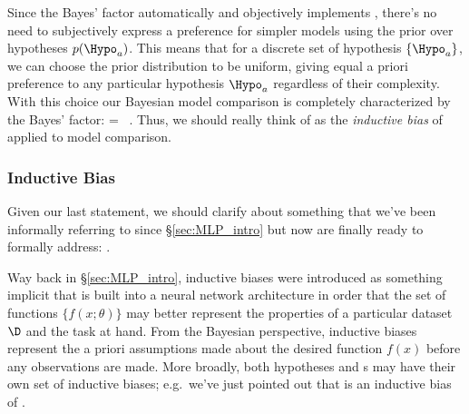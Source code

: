 Since the Bayes' factor automatically and objectively implements , there's no need to subjectively express a preference for simpler models using the prior over hypotheses $p(\Hypo_a)$. This means that for a discrete set of hypothesis $\{\Hypo_a \}$, we can choose the prior distribution to be uniform, giving equal a priori preference to any particular hypothesis  $\Hypo_a$ regardless of their complexity.
With this choice our Bayesian model comparison is completely characterized by the  Bayes' factor:
\be\label{eq:bayes-factor-equal-hypo}
 = \, .
\ee
Thus, we should really think of  as the \emph{inductive bias} of  applied to model comparison.


 

















\subsubsection{Inductive Bias}
Given our last statement, we should clarify about something that we've been informally referring to since \S\ref{sec:MLP_intro} but now are finally ready to formally address:
.



Way back in \S\ref{sec:MLP_intro}, inductive biases were introduced as something implicit that is 
built into a neural network architecture in order that the set of functions $\{ f(x;\theta)\}$ may better represent the properties of a particular dataset $\D$ and the
 task at hand. From the Bayesian perspective, inductive biases represent the a priori assumptions made about the desired function $f(x)$ before any observations are made. More broadly, both hypotheses and s may have their own set of inductive biases; e.g.~we've just pointed out that  is an inductive bias of .


